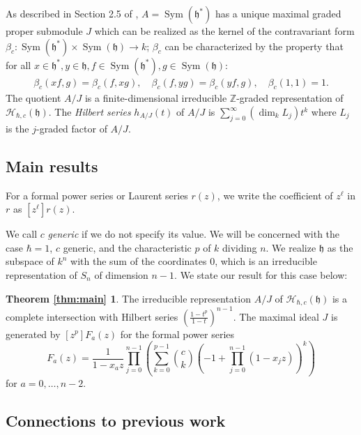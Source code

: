 \documentclass{amsart}
\numberwithin{equation}{section}
\theoremstyle{definition}
\newcommand{\h}{\mathfrak{h}}
\newcommand{\HH}{\mathcal{H}}
\newcommand{\Sym}{\operatorname{Sym}}
\begin{document}
As described in Section 2.5 of \cite{BC1}, $A=\Sym(\h^*)$ has a unique maximal graded proper submodule $J$ which can be realized as the kernel of the contravariant form $\beta_c: \Sym(\h^*) \times \Sym(\h) \to k$; $\beta_c$ can be characterized by the property that for all $x \in \h^*, y \in \h, f \in \Sym(\h^*), g \in  \Sym(\h)$:
\begin{align*}
\beta_c(xf,g)=\beta_c(f,xg), \quad \beta_c(f,yg) = \beta_c(yf,g), \quad \beta_c(1,1) = 1.
\end{align*}
The quotient $A/J$ is a finite-dimensional irreducible $\mathbb{Z}$-graded representation of $\HH_{\hbar,c}(\h)$. The {\it Hilbert series} $h_{A/J}(t)$ of $A/J$ is $\sum_{j=0}^\infty (\dim_k L_j)t^k$ where $L_j$ is the $j$-graded factor of $A/J$. 

\subsection{Main results}

For a formal power series or Laurent series $r(z)$, we write the coefficient of $z^\ell$ in $r$ as $[z^\ell]r(z)$. 

 We call $c$ {\it generic} if we do not specify its value. We will be concerned with the case $\hbar=1$, $c$ generic, and the characteristic $p$ of $k$ dividing $n$. We realize $\h$ as the subspace of $k^n$ with the sum of the coordinates $0$, which is an irreducible representation of $S_n$ of dimension $n-1$. We state our result for this case below:
 
 \newtheorem*{thm:main}{Theorem \ref{thm:main}}
\begin{thm:main} The irreducible representation $A/J$  of $\HH_{\hbar,c}(\h)$ is a complete intersection with  Hilbert series $\left(\frac{1-t^p}{1-t}\right)^{n-1}$. The maximal ideal $J$ is generated by $[z^p]F_a(z)$ for the formal power series $$F_a(z)=\frac{1}{1-x_az} \prod_{j=0}^{n-1}\left( \sum_{k=0}^{p-1} \binom{c}{k}(-1+\prod_{j=0}^{n-1} (1-x_jz))^k\right)$$ for $a=0,\dots,n-2$. 
\end{thm:main}


\subsection{Connections to previous work}
\end{document}
